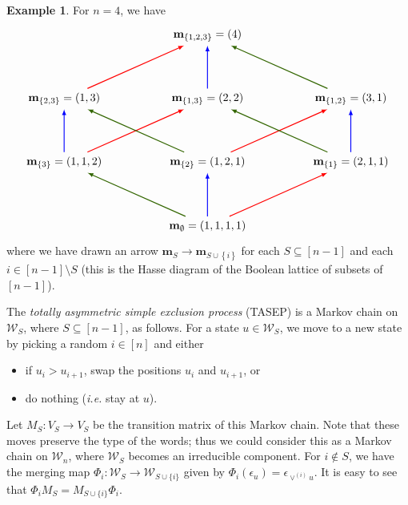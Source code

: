 \documentclass[reqno]{amsart}
\newcommand{\mbf}{\mathbf}
\newcommand{\0}{\phantom{c}}
\newcommand{\merge}[1]{\vee_{#1}} %
\newcommand{\mm}{\mathbf{m}}
\newcommand{\mcW}{\mathcal{W}}
\newcommand{\set}[1]{\left\{ #1 \right\}}
\newcommand{\defn}[1]{{\color{darkred}\emph{#1}}} %
\theoremstyle{plain}
\theoremstyle{definition}
\newtheorem{example}[thm]{Example}
\numberwithin{equation}{section}
\begin{document}
\begin{example}
  For $n = 4$, we have
  \[
  \begin{tikzpicture}[xscale=4.5,yscale=2,thick,>=latex]
  \node (E) at (1,0) {$\mbf{m}_{\emptyset} = (1,1,1,1)$};
  \node (1) at (2,1) {$\mbf{m}_{\{1\}} = (2,1,1)$};
  \node (2) at (1,1) {$\mbf{m}_{\{2\}} = (1,2,1)$};
  \node (3) at (0,1) {$\mbf{m}_{\{3\}} = (1,1,2)$};
  \node (12) at (2,2) {$\mbf{m}_{\{1,2\}} = (3,1)$};
  \node (13) at (1,2) {$\mbf{m}_{\{1,3\}} = (2,2)$};
  \node (23) at (0,2) {$\mbf{m}_{\{2,3\}} = (1,3)$};
  \node (123) at (1,3) {$\mbf{m}_{\{1,2,3\}} = (4)$};
  \draw[->,red] (E) -- (1);
  \draw[->,blue] (E) -- (2);
  \draw[->,dgreencolor] (E) -- (3);
  \draw[->,red] (2) -- (12);
  \draw[->,red] (3) -- (13);
  \draw[->,blue] (3) -- (23);
  \draw[->,blue] (1) -- (12);
  \draw[->,dgreencolor] (1) -- (13);
  \draw[->,dgreencolor] (2) -- (23);
  \draw[->,red] (23) -- (123);
  \draw[->,blue] (13) -- (123);
  \draw[->,dgreencolor] (12) -- (123);
  \end{tikzpicture}
  \]
  where we have drawn an arrow $\mm_S \to \mm_{S \cup \set{i}}$ for each $S \subseteq [n-1]$ and each $i \in [n-1] \setminus S$ (this is the Hasse diagram of the Boolean lattice of subsets of $[n-1]$).
\end{example}

The \defn{totally asymmetric simple exclusion process} (TASEP) is a Markov chain on $\mcW_S$, where $S \subseteq[n-1]$, as follows.
For a state $u \in \mcW_S$, we move to a new state by picking a random $i \in [n]$ and either
\begin{itemize}
\item if $u_i > u_{i+1}$, swap the positions $u_i$ and $u_{i+1}$, or
\item do nothing (\textit{i.e.} stay at $u$).
\end{itemize}
Let $M_S \colon V_S \to V_S$ be the transition matrix of this Markov chain.
Note that these moves preserve the type of the words; thus we could consider this as a Markov chain on $\mcW_n$, where $\mcW_S$ becomes an irreducible component.
For $i \notin S$, we have the merging map $\Phi_i \colon \mcW_S \to \mcW_{S\cup\{i\}}$ given by
$\Phi_i(\epsilon_u) = \epsilon_{\vee^{(i)} u}$.
It is easy to see that $\Phi_i M_S = M_{S\cup \{i\}} \Phi_i$. 
\end{document}
